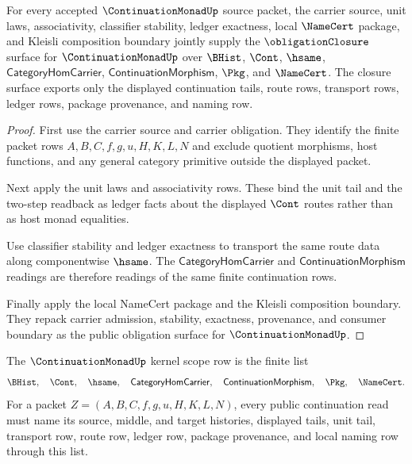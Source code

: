 \begin{theorem}
\label{thm:continuation-monad-obligation-closure}
For every accepted $\ContinuationMonadUp$ source packet, the carrier source, unit laws, associativity, classifier stability, ledger exactness, local $\NameCert$ package, and Kleisli composition boundary jointly supply the $\obligationClosure$ surface for $\ContinuationMonadUp$ over $\BHist$, $\Cont$, $\hsame$, $\mathsf{CategoryHomCarrier}$, $\mathsf{ContinuationMorphism}$, $\Pkg$, and $\NameCert$. The closure surface exports only the displayed continuation tails, route rows, transport rows, ledger rows, package provenance, and naming row.
\end{theorem}
\begin{proof}
First use the carrier source and carrier obligation. They identify the finite packet rows $A,B,C,f,g,u,H,K,L,N$ and exclude quotient morphisms, host functions, and any general category primitive outside the displayed packet.

Next apply the unit laws and associativity rows. These bind the unit tail and the two-step readback as ledger facts about the displayed $\Cont$ routes rather than as host monad equalities.

Use classifier stability and ledger exactness to transport the same route data along componentwise $\hsame$. The $\mathsf{CategoryHomCarrier}$ and $\mathsf{ContinuationMorphism}$ readings are therefore readings of the same finite continuation rows.

Finally apply the local NameCert package and the Kleisli composition boundary. They repack carrier admission, stability, exactness, provenance, and consumer boundary as the public obligation surface for $\ContinuationMonadUp$.
\end{proof}

\begin{definition}
\label{def:continuation-monad-kernel-scope-row}
The $\ContinuationMonadUp$ kernel scope row is the finite list
$$
\BHist,\quad \Cont,\quad \hsame,\quad \mathsf{CategoryHomCarrier},\quad \mathsf{ContinuationMorphism},\quad \Pkg,\quad \NameCert.
$$
For a packet $Z=(A,B,C,f,g,u,H,K,L,N)$, every public continuation read must name its source, middle, and target histories, displayed tails, unit tail, transport row, route row, ledger row, package provenance, and local naming row through this list.
\end{definition}

